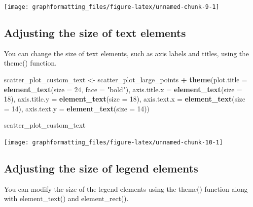 \documentclass[
]{book}
\newenvironment{Shaded}{\begin{snugshade}}{\end{snugshade}}
\newcommand{\AttributeTok}[1]{\textcolor[rgb]{0.13,0.29,0.53}{#1}}
\newcommand{\DecValTok}[1]{\textcolor[rgb]{0.00,0.00,0.81}{#1}}
\newcommand{\FunctionTok}[1]{\textcolor[rgb]{0.13,0.29,0.53}{\textbf{#1}}}
\newcommand{\NormalTok}[1]{#1}
\newcommand{\OtherTok}[1]{\textcolor[rgb]{0.56,0.35,0.01}{#1}}
\newcommand{\SpecialCharTok}[1]{\textcolor[rgb]{0.81,0.36,0.00}{\textbf{#1}}}
\newcommand{\StringTok}[1]{\textcolor[rgb]{0.31,0.60,0.02}{#1}}
\begin{document}
\texttt{[image: graphformatting\_files/figure-latex/unnamed-chunk-9-1]}

\hypertarget{adjusting-the-size-of-text-elements}{%
\subsection{Adjusting the size of text elements}\label{adjusting-the-size-of-text-elements}}

You can change the size of text elements, such as axis labels and titles, using the theme() function.

\begin{Shaded}
\begin{Highlighting}[]
\NormalTok{scatter\_plot\_custom\_text }\OtherTok{\textless{}{-}}\NormalTok{ scatter\_plot\_large\_points }\SpecialCharTok{+}
  \FunctionTok{theme}\NormalTok{(}\AttributeTok{plot.title =} \FunctionTok{element\_text}\NormalTok{(}\AttributeTok{size =} \DecValTok{24}\NormalTok{, }\AttributeTok{face =} \StringTok{"bold"}\NormalTok{),}
        \AttributeTok{axis.title.x =} \FunctionTok{element\_text}\NormalTok{(}\AttributeTok{size =} \DecValTok{18}\NormalTok{),}
        \AttributeTok{axis.title.y =} \FunctionTok{element\_text}\NormalTok{(}\AttributeTok{size =} \DecValTok{18}\NormalTok{),}
        \AttributeTok{axis.text.x =} \FunctionTok{element\_text}\NormalTok{(}\AttributeTok{size =} \DecValTok{14}\NormalTok{),}
        \AttributeTok{axis.text.y =} \FunctionTok{element\_text}\NormalTok{(}\AttributeTok{size =} \DecValTok{14}\NormalTok{))}

\NormalTok{scatter\_plot\_custom\_text}
\end{Highlighting}
\end{Shaded}

\texttt{[image: graphformatting\_files/figure-latex/unnamed-chunk-10-1]}

\hypertarget{adjusting-the-size-of-legend-elements}{%
\subsection{Adjusting the size of legend elements}\label{adjusting-the-size-of-legend-elements}}

You can modify the size of the legend elements using the theme() function along with element\_text() and element\_rect().
\end{document}
